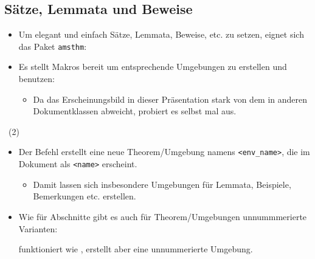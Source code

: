 \subsection{Sätze, Lemmata und Beweise}

\begin{frame}[fragile]{\subsecname}
    \begin{itemize}
        \item Um elegant und einfach Sätze, Lemmata, Beweise, etc. zu setzen, eignet sich das Paket
            \texttt{amsthm}:
            \begin{center}
                \code{\usepackage{amsthm}}
            \end{center}
        \item Es stellt Makros bereit um entsprechende Umgebungen zu erstellen und benutzen:
            \begin{itemize}
                \item Da das Erscheinungsbild in dieser Präsentation stark von dem in anderen
                    Dokumentklassen abweicht, probiert es selbst mal aus.
            \end{itemize}
    \end{itemize}
\end{frame}

\begin{frame}[fragile]{\subsecname~(2)}
    \begin{itemize}
        \item Der Befehl  erstellt eine neue
            Theorem\-/Umgebung namens \texttt{<env\_name>}, die im Dokument als \texttt{<name>}
            erscheint.
            \begin{itemize}
                \item Damit lassen sich insbesondere Umgebungen für Lemmata, Beispiele, Bemerkungen
                    etc. erstellen.
            \end{itemize}
        \item Wie für Abschnitte gibt es auch für Theorem\-/Umgebungen unnummmerierte Varianten:
            \begin{center}
            \end{center}
            funktioniert wie \code{\newtheorem}, erstellt aber eine unnummerierte Umgebung.
    \end{itemize}
\end{frame}
